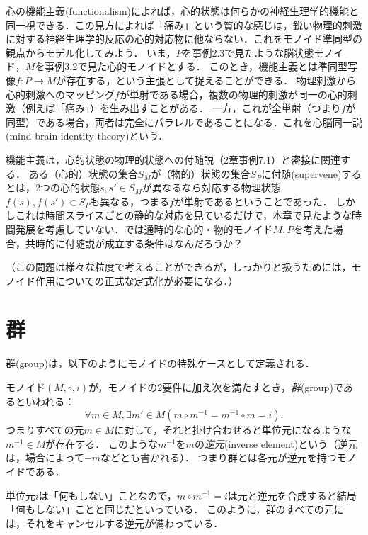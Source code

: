 \documentclass[11pt,a4paper]{jsarticle}
\begin{document}
\begin{example}
    心の機能主義(functionalism)によれば，心的状態は何らかの神経生理学的機能と同一視できる．この見方によれば「痛み」という質的な感じは，鋭い物理的刺激に対する神経生理学的反応の心的対応物に他ならない．これをモノイド準同型の観点からモデル化してみよう．
    いま，$P$を事例2.3で見たような脳状態モノイド，$M$を事例3.2で見た心的モノイドとする．
    このとき，機能主義とは準同型写像$f:P \to M$が存在する，という主張として捉えることができる．
    物理刺激から心的刺激へのマッピング$f$が単射である場合，複数の物理的刺激が同一の心的刺激（例えば「痛み」）を生み出すことがある．
    一方，これが全単射（つまり$f$が同型）である場合，両者は完全にパラレルであることになる．これを心脳同一説(mind-brain identity theory)という．
\end{example}

\begin{exercise}
    機能主義は，心的状態の物理的状態への付随説（2章事例7.1）と密接に関連する．
    ある（心的）状態の集合$S_M$が（物的）状態の集合$S_P$に付随(supervene)するとは，2つの心的状態$s, s' \in S_M$が異なるなら対応する物理状態$f(s), f(s') \in S_P$も異なる，つまる$f$が単射であるということであった．
    しかしこれは時間スライスごとの静的な対応を見ているだけで，本章で見たような時間発展を考慮していない．では通時的な心的・物的モノイド$M, P$を考えた場合，共時的に付随説が成立する条件はなんだろうか？

    （この問題は様々な粒度で考えることができるが，しっかりと扱うためには，モノイド作用についての正式な定式化が必要になる．）
\end{exercise}


\section{群}
群(group)は，以下のようにモノイドの特殊ケースとして定義される．
\begin{dfn}[群]
    モノイド$(M, \circ, i)$が，モノイドの2要件に加え次を満たすとき，\emph{群}(group)であるといわれる：
    \[ \forall m \in M, \exists m' \in M (m \circ m^{-1} = m^{-1} \circ m = i).\]
    つまりすべての元$m \in M$に対して，それと掛け合わせると単位元になるような$m^{-1} \in M$が存在する．
    このような$m^{-1}$を$m$の\emph{逆元}(inverse element)という（逆元は，場合によって$-m$などとも書かれる）．
    つまり群とは各元が逆元を持つモノイドである．
\end{dfn}    

単位元$i$は「何もしない」ことなので，$m \circ m^{-1} = i$は元と逆元を合成すると結局「何もしない」ことと同じだといっている．
このように，群のすべての元には，それをキャンセルする逆元が備わっている．
\end{document}
